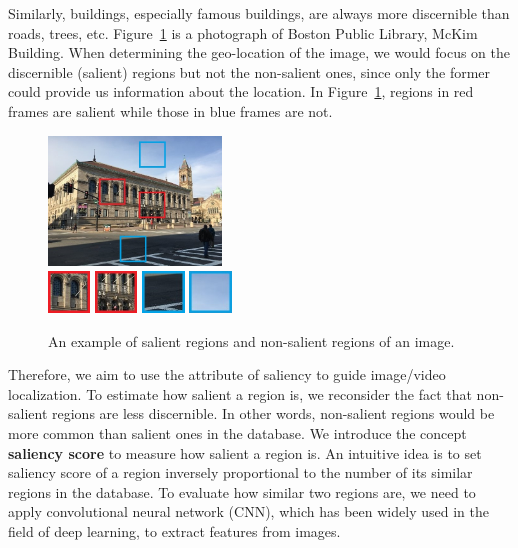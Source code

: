 Similarly, buildings, especially famous buildings, are always more discernible than roads, trees, etc.  Figure~\ref{fig:library} is a photograph of Boston Public Library, McKim Building. When determining the geo-location of the image, we would focus on the discernible (salient) regions but not the non-salient ones, since only the former could provide us information about the location. In Figure~\ref{fig:library}, regions in red frames are salient while those in blue frames are not.
\begin{figure}[htbp]
\includegraphics[width=0.41\textwidth]{img/library}
\\[0.1cm]
\includegraphics[width=0.1\textwidth]{img/library_1}
\includegraphics[width=0.1\textwidth]{img/library_2}
\includegraphics[width=0.1\textwidth]{img/library_3}
\includegraphics[width=0.1\textwidth]{img/library_4}
\caption{An example of salient regions and non-salient regions of an image.}
\label{fig:library}
\end{figure}
\par
Therefore, we aim to use the attribute of saliency to guide image/video localization. To estimate how salient a region is, we reconsider the fact that non-salient regions are less discernible. In other words, non-salient regions would be more common than salient ones in the database. We introduce the concept \textbf{saliency score} to measure how salient a region is. An intuitive idea is to set saliency score of a region inversely proportional to the number of its similar regions in the database. To evaluate how similar two regions are, we need to apply convolutional neural network (CNN), which has been widely used in the field of deep learning, to extract features from images. 
